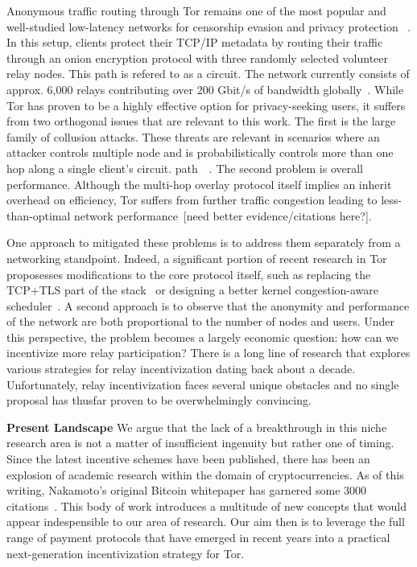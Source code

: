 Anonymous traffic routing through Tor remains one of the most popular and
well-studied low-latency networks for censorship evasion and privacy protection
~\cite{dingledine2004tor}. In this setup, clients protect their TCP/IP metadata
by routing their traffic through an onion encryption protocol with three
randomly selected volunteer relay nodes. This path is refered to as a
circuit. The network currently consists of approx. 6,000 relays contributing
over 200 Gbit/s of bandwidth globally~\cite{portal2018tormetrics}. While Tor has
proven to be a highly effective option for privacy-seeking users, it suffers
from two orthogonal issues that are relevant to this work. The first is the
large family of collusion attacks. These threats are relevant in scenarios where
an attacker controls multiple node and is probabilistically controls more than
one hop along a single client's circuit.
path~\cite{wright2004predecessor}~\cite{murdoch2005low}. The second problem is
overall performance. Although the multi-hop overlay protocol itself implies an
inherit overhead on efficiency, Tor suffers from further traffic congestion
leading to less-than-optimal network
performance~\cite{portal2018tormetrics}[need better evidence/citations here?].

One approach to mitigated these problems is to address them separately from a
networking standpoint. Indeed, a significant portion of recent research in Tor
proposesses modifications to the core protocol itself, such as replacing the TCP+TLS part of the stack~\cite{} or designing a better kernel congestion-aware scheduler~\cite{}. A second approach
is to observe that the anonymity and performance of the network are both
proportional to the number of nodes and users. Under this perspective, the problem becomes
a largely economic question: how can we incentivize more relay participation?
There is a long line of research that explores various strategies for relay
incentivization dating back about a decade. Unfortunately, relay incentivization
faces several unique obstacles and no single proposal has thusfar proven to be
overwhelmingly convincing.

\textbf{Present Landscape} We argue that the lack of a breakthrough in this
niche research area is not a matter of insufficient ingenuity but rather one of
timing. Since the latest incentive schemes have been published, there has been
an explosion of academic research within the domain of cryptocurrencies. As of
this writing, Nakamoto's original Bitcoin whitepaper has garnered some 3000
citations~\cite{nakamoto2008bitcoin}. This body of work introduces a multitude
of new concepts that would appear indespensible to our area of research. Our
aim then is to leverage the full range of payment protocols that have emerged in
recent years into a practical next-generation incentivization strategy for Tor.

